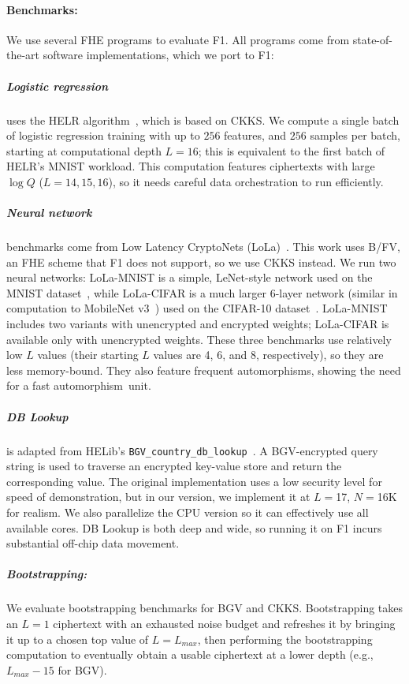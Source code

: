 \paragraph{Benchmarks:}
We use several FHE programs to evaluate F1. All programs come from
state-of-the-art software implementations, which we port to F1:

\subparagraph{Logistic regression}
uses the HELR algorithm~\cite{han:aaai19:logistic}, which is based on CKKS. We
compute a single batch of logistic regression training with up to $256$
features, and $256$ samples per batch, starting at computational depth $L =
16$; this is equivalent to the first batch of HELR's MNIST workload. This
computation features ciphertexts with large $\log Q$ ($L = 14,15,16$), so it
needs careful data orchestration to run efficiently.

\subparagraph{Neural network} benchmarks come from Low Latency CryptoNets
(LoLa)~\cite{brutzkus:icml19:low}. This work uses B/FV, an FHE scheme that F1
does not support, so we use CKKS instead. We run two neural networks:
LoLa-MNIST is a simple, LeNet-style network used on the MNIST
dataset~\cite{lecunn:ieee98:gradient-document}, while LoLa-CIFAR is a much
larger 6-layer network (similar in computation to MobileNet
v3~\cite{howard2019searching}) used on the CIFAR-10 dataset~\cite{cifar10}.
LoLa-MNIST includes two variants with unencrypted and encrypted weights;
LoLa-CIFAR is available only with unencrypted weights. These three benchmarks
use relatively low $L$ values (their starting $L$ values are 4, 6, and 8,
respectively), so they are less memory-bound. They also feature frequent
automorphisms, showing the need for a fast automorphism~unit.

\tblFOneGF

\subparagraph{DB Lookup} is adapted from HELib's
\texttt{BGV\_country\_db\_lookup}~\cite{helib:db-lookup}. A BGV-encrypted query
string is used to traverse an encrypted key-value store and return the
corresponding value. The original implementation uses a low security level for
speed of demonstration, but in our version, we implement it at $L=$17, $N=$16K
for realism. We also parallelize the CPU version so it can effectively use all
available cores. DB Lookup is both deep and wide, so running it on F1 incurs
substantial off-chip data movement.

\addtocounter{table}{1}
\tblFOneMicrobenchmark

\subparagraph{Bootstrapping:} We evaluate bootstrapping benchmarks for BGV and
CKKS. Bootstrapping takes an $L=1$ ciphertext with an exhausted noise budget
and refreshes it by bringing it up to a chosen top value of $L=L_{max}$, then
performing the bootstrapping computation to eventually obtain a usable
ciphertext at a lower depth (e.g., $L_{max} - 15$ for BGV).

